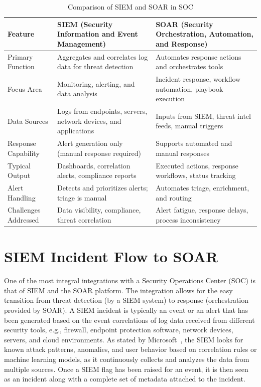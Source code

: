 \begin{table}[H]
\centering
\caption{Comparison of SIEM and SOAR in SOC}
\begin{tabular}{|p{4cm}|p{5cm}|p{5cm}|}
\hline
\textbf{Feature} & \textbf{SIEM (Security Information and Event Management)} & \textbf{SOAR (Security Orchestration, Automation, and Response)} \\
\hline
Primary Function & Aggregates and correlates log data for threat detection & Automates response actions and orchestrates tools \\
\hline
Focus Area & Monitoring, alerting, and data analysis & Incident response, workflow automation, playbook execution \\
\hline
Data Sources & Logs from endpoints, servers, network devices, and applications & Inputs from SIEM, threat intel feeds, manual triggers \\
\hline
Response Capability & Alert generation only (manual response required) & Supports automated and manual responses \\
\hline
Typical Output & Dashboards, correlation alerts, compliance reports & Executed actions, response workflows, status tracking \\
\hline
Alert Handling & Detects and prioritizes alerts; triage is manual & Automates triage, enrichment, and routing \\
\hline
Challenges Addressed & Data visibility, compliance, threat correlation & Alert fatigue, response delays, process inconsistency \\
\hline
\end{tabular}
\label{tab:siem-vs-soar}
\end{table}

\section{SIEM Incident Flow to SOAR}

One of the most integral integrations with a Security Operations Center (SOC) is that of SIEM and the SOAR platform. The integration allows for the easy transition from threat detection (by a SIEM system) to response (orchestration provided by SOAR). A SIEM incident is typically an event or an alert that has been generated based on the event correlations of log data received from different security tools, e.g., firewall, endpoint protection software, network devices, servers, and cloud environments. As stated by Microsoft~\cite{microsoftsiem}, the SIEM looks for known attack patterns, anomalies, and user behavior based on correlation rules or machine learning models, as it continuously collects and analyzes the data from multiple sources. Once a SIEM flag has been raised for an event, it is then seen as an incident along with a complete set of metadata attached to the incident.

